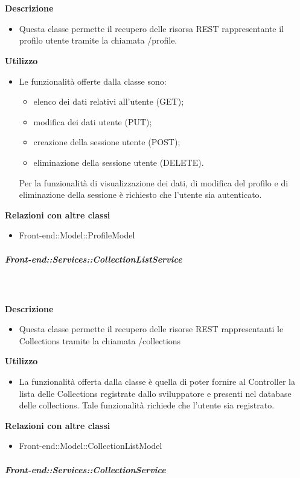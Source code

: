         \textbf{\\ \\ Descrizione} 
          \begin{itemize}
            \item[] Questa classe permette il recupero delle risorsa REST rappresentante il profilo utente tramite la chiamata /profile.
          \end{itemize}      
        \textbf{Utilizzo}  
          \begin{itemize}
            \item[] Le funzionalità offerte dalla classe sono:
\begin{itemize}
\item elenco dei dati relativi all'utente (GET);
\item modifica dei dati utente (PUT);
\item creazione della sessione utente (POST);
\item eliminazione della sessione utente (DELETE).
\end{itemize}

Per la funzionalità di visualizzazione dei dati, di modifica del profilo e di eliminazione della sessione è richiesto che l'utente sia autenticato.
          \end{itemize}
          \textbf{Relazioni con altre classi}
          \begin{itemize}
              \item{Front-end::Model::ProfileModel}
          \end{itemize}
      \subparagraph{Front-end::Services::CollectionListService}
        
        \textbf{\\ \\ Descrizione} 
          \begin{itemize}
            \item[] Questa classe permette il recupero delle risorse REST rappresentanti le Collections tramite la chiamata /collections
          \end{itemize}      
        \textbf{Utilizzo}  
          \begin{itemize}
            \item[] La funzionalità offerta dalla classe è quella di poter fornire al Controller la lista delle Collections registrate dallo sviluppatore e presenti nel database delle collections.
Tale funzionalità richiede che l'utente sia registrato.
          \end{itemize}
          \textbf{Relazioni con altre classi}
          \begin{itemize}
              \item{Front-end::Model::CollectionListModel}
          \end{itemize}
      \subparagraph{Front-end::Services::CollectionService}
        
